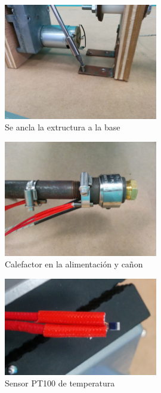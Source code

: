    	\begin{figure}[H]
            \centering
            \includegraphics[width=0.6\textwidth]{images/filaextruder/IMG_20150313_114401.jpg}
            \caption{Se ancla la extructura a la base}
            \label{fig:fila_montaje1}
    \end{figure}
    \begin{figure}[H]
            \centering
            \includegraphics[width=0.6\textwidth]{images/filaextruder/IMG_20150324_175818.jpg}
            \caption{Calefactor en la alimentación y cañon}
            \label{fig:fila_montaje2}
    \end{figure}
    \begin{figure}[H]
            \centering
            \includegraphics[width=0.6\textwidth]{images/filaextruder/IMG_20150325_145634.jpg}
            \caption{Sensor PT100 de temperatura}
            \label{fig:fila_montaje3}
    \end{figure}


